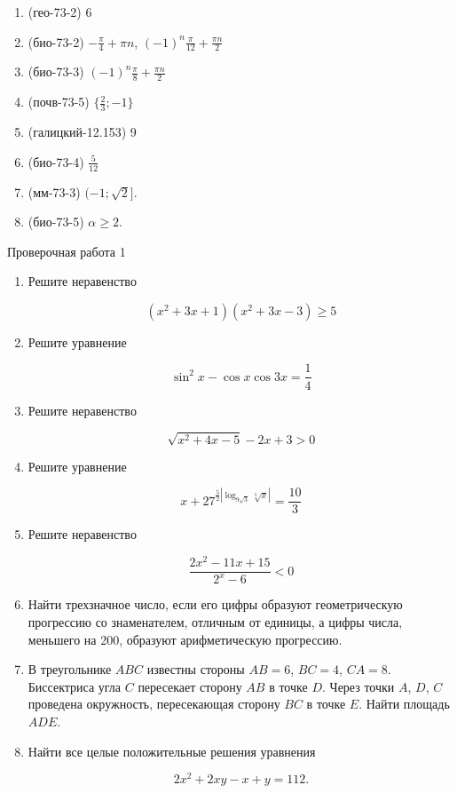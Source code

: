 \documentclass[11pt,a5paper]{report}
\begin{document}
\begin{enumerate}

\item (гео-73-2) 6

\item (био-73-2) $-\frac{\pi}{4} + \pi n$, $(-1)^n \frac{\pi}{12} + \frac{\pi n}{2}$

\item (био-73-3) $(-1)^n \frac{\pi}{8} + \frac{\pi n}{2}$

\item (почв-73-5) $\{ \frac23; -1\}$

\item (галицкий-12.153) 9

\item (био-73-4) $\frac{5}{12}$

\item (мм-73-3) $(-1; \sqrt{2} ]$.

\item (био-73-5) $\alpha \geqslant 2$.

\end{enumerate}
\newpage

\begin{center}
Проверочная работа 1


\end{center}

\begin{enumerate}
\item Решите неравенство

$$ (x^2 + 3 x + 1) (x^2 + 3 x - 3) \geqslant 5$$

\item Решите уравнение

$$ \sin^2{x} - \cos{x} \cos{3x} = \frac{1}{4}$$

\item Решите неравенство

$$ \sqrt{x^2 + 4 x - 5} - 2 x + 3 > 0$$

\item Решите уравнение

$$x + 27^{\frac52 | \log_{9 \sqrt{3}} {\sqrt[3]{x}} |} = \frac{10}{3} $$

\item Решите неравенство

$$\frac{2x^2 - 11 x + 15}{2^x - 6} < 0$$

\item Найти трехзначное число, если его цифры образуют геометрическую прогрессию со знаменателем, отличным от единицы, а цифры числа, меньшего на 200, образуют арифметическую прогрессию.

\item В треугольнике $ABC$ известны стороны $AB = 6$, $BC = 4$, $CA = 8$. Биссектриса угла $C$ пересекает сторону $AB$ в точке $D$. Через точки $A$, $D$, $C$ проведена окружность, пересекающая сторону $BC$ в точке $E$. Найти площадь $ADE$.

\item Найти все целые положительные решения уравнения

$$2x^2 + 2xy - x + y = 112.$$
\end{enumerate}
\end{document}
